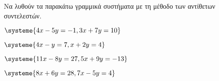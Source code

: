 Να λυθούν τα παρακάτω γραμμικά συστήματα με τη μέθοδο των αντίθετων συντελεστών.
\begin{multicols}{2}
\begin{rlist}[leftmargin=5mm]
\item $ \systeme{4x-5y=-1,3x+7y=10} $
\item $ \systeme{4x-y=7,x+2y=4} $
\item $ \systeme{11x-8y=27,5x+9y=-13} $
\item $ \systeme{8x+6y=28,7x-5y=4} $
\end{rlist}
\end{multicols}
